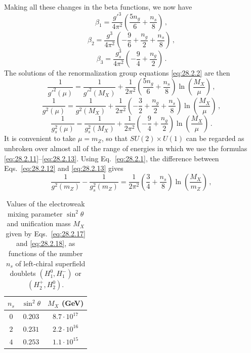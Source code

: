 Making all these changes in the beta functions, we now have
\begin{equation}
  \beta_1=\frac{g'^3}{4\pi^2}
  \left(\frac{5n_g}{6}+\frac{n_s}{8}\right)\,,
  \tag{28.2.8}\label{eq:28.2.8}
\end{equation}
\begin{equation}
  \beta_2=\frac{g^3}{4\pi^2}
  \left(-\frac{9}{6}+\frac{n_g}{2}+\frac{n_s}{8}\right)\,,
  \tag{28.2.9}\label{eq:28.2.9}
\end{equation}
\begin{equation}
  \beta_3=\frac{g_s^3}{4\pi^2}
  \left(-\frac{9}{4}+\frac{n_g}{2}\right)\,.
  \tag{28.2.10}\label{eq:28.2.10}
\end{equation}
The solutions of the renormalization group equations \eqref{eq:28.2.2} are
then
\begin{equation}
  \frac{1}{g'^2(\mu)}
  =\frac{1}{g'^2(M_X)}
  +\frac{1}{2\pi^2}
  \left(\frac{5n_g}{6}+\frac{n_s}{8}\right)
  \ln\left(\frac{M_X}{\mu}\right)\,,
  \tag{28.2.11}\label{eq:28.2.11}
\end{equation}
\begin{equation}
  \frac{1}{g^2(\mu)}
  =\frac{1}{g^2(M_X)}
  +\frac{1}{2\pi^2}
  \left(-\frac{3}{2}+\frac{n_g}{2}+\frac{n_s}{8}\right)
  \ln\left(\frac{M_X}{\mu}\right)\,,
  \tag{28.2.12}\label{eq:28.2.12}
\end{equation}
\begin{equation}
  \frac{1}{g_s^2(\mu)}
  =\frac{1}{g_s^2(M_X)}
  +\frac{1}{2\pi^2}
  \left(-\frac{9}{4}+\frac{n_g}{2}\right)
  \ln\left(\frac{M_X}{\mu}\right)\,.
  \tag{28.2.13}\label{eq:28.2.13}
\end{equation}
It is convenient to take \(\mu=m_Z\), so that \(SU(2)\times U(1)\) can be
regarded as unbroken over almost all of the range of energies in which we
use the formulas \eqref{eq:28.2.11}--\eqref{eq:28.2.13}. Using
Eq.~\eqref{eq:28.2.1}, the difference between Eqs.~\eqref{eq:28.2.12} and
\eqref{eq:28.2.13} gives
\begin{equation}
  \frac{1}{g^2(m_Z)}-\frac{1}{g_s^2(m_Z)}
  =\frac{1}{2\pi^2}
  \left(\frac{3}{4}+\frac{n_s}{8}\right)
  \ln\left(\frac{M_X}{m_Z}\right)\,,
  \tag{28.2.14}\label{eq:28.2.14}
\end{equation}

\begin{table}[H]
  \renewcommand{\thetable}{28.1}
  \centering
  \caption{Values of the electroweak mixing parameter \(\sin^2\theta\) and
  unification mass \(M_X\) given by Eqs.~\eqref{eq:28.2.17} and
  \eqref{eq:28.2.18}, as functions of the number \(n_s\) of left-chiral
  superfield doublets \((H_1^0,H_1^-)\) or \((H_2^+,H_2^0)\).}
  \label{tab:28.1}
  \begin{tabular}{c@{\qquad}c@{\qquad}c}
    \hline\hline
    \(n_s\) & \(\sin^2\theta\) & \(M_X\) (GeV) \\
    \hline
    \(0\) & \(0.203\) & \(8.7\cdot10^{17}\) \\
    \(2\) & \(0.231\) & \(2.2\cdot10^{16}\) \\
    \(4\) & \(0.253\) & \(1.1\cdot10^{15}\) \\
    \hline\hline
  \end{tabular}
\end{table}

